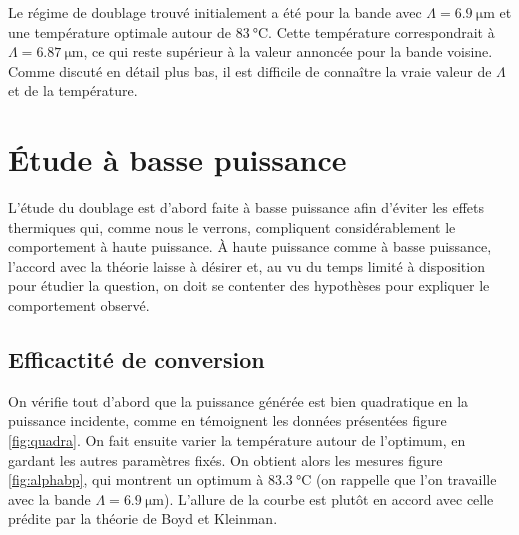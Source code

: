\documentclass[11pt,a4paper]{article}
\begin{document}



Le régime de doublage trouvé initialement a été pour la bande avec $\Lambda = \SI{6.9}{\micro\meter}$ et une température optimale autour de $\SI{83}{\celsius}$. Cette température correspondrait à $\Lambda=\SI{6.87}{\micro\meter}$, ce qui reste supérieur à la valeur annoncée pour la bande voisine. Comme discuté en détail plus bas, il est difficile de connaître la vraie valeur de $\Lambda$ et de la température.

\section{Étude à basse puissance}

L'étude du doublage est d'abord faite à basse puissance afin d'éviter les effets thermiques qui, comme nous le verrons, compliquent considérablement le comportement à haute puissance. À haute puissance comme à basse puissance, l'accord avec la théorie laisse à désirer et, au vu du temps limité à disposition pour étudier la question, on doit se contenter des hypothèses pour expliquer le comportement observé.

\subsection{Efficactité de conversion} 

On vérifie tout d'abord que la puissance générée est bien quadratique en la puissance incidente, comme en témoignent les données présentées figure \ref{fig:quadra}. On fait ensuite varier la température autour de l'optimum, en gardant les autres paramètres fixés. On obtient alors les mesures figure \ref{fig:alphabp}, qui montrent un optimum à $\SI{83.3}{\celsius}$ (on rappelle que l'on travaille avec la bande $\Lambda = \SI{6.9}{\micro\meter}$). L'allure de la courbe est plutôt en accord avec celle prédite par la théorie de Boyd et Kleinman. 
\end{document}
